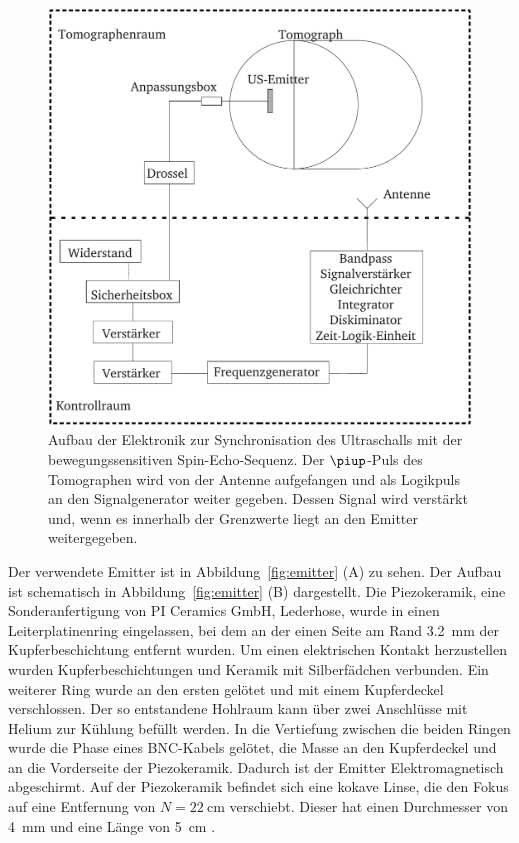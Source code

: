 \documentclass[
    11pt,
    ngerman
]{scrreprt}
\begin{document}
\begin{figure}[htbp]
    \centering
    \includegraphics[width=.8\textwidth]{Abbildungen/elektronik.pdf}
    \caption{%
        Aufbau der Elektronik zur Synchronisation des Ultraschalls mit der bewegungssensitiven Spin-Echo-Sequenz. Der $\piup$-Puls des Tomographen wird von der Antenne aufgefangen und als Logikpuls an den Signalgenerator weiter gegeben. Dessen Signal wird verstärkt und, wenn es innerhalb der Grenzwerte liegt an den Emitter weitergegeben.
    }
    \label{fig:elektronik}
\end{figure}

Der verwendete Emitter ist in Abbildung~\ref{fig:emitter} (A) zu sehen. Der Aufbau ist schematisch in Abbildung~\ref{fig:emitter} (B) dargestellt. Die Piezokeramik, eine Sonderanfertigung von PI Ceramics GmbH, Lederhose, wurde in einen Leiterplatinenring eingelassen, bei dem an der einen Seite am Rand \SI{3.2}{\milli\meter} der Kupferbeschichtung entfernt wurden. Um einen elektrischen Kontakt herzustellen wurden Kupferbeschichtungen und Keramik mit Silberfädchen verbunden. Ein weiterer Ring wurde an den ersten gelötet und mit einem Kupferdeckel verschlossen. Der so entstandene Hohlraum kann über zwei Anschlüsse mit Helium zur Kühlung befüllt werden. In die Vertiefung zwischen die beiden Ringen wurde die Phase eines BNC-Kabels gelötet, die Masse an den Kupferdeckel und an die Vorderseite der Piezokeramik. Dadurch ist der Emitter Elektromagnetisch abgeschirmt. Auf der Piezokeramik befindet sich eine kokave Linse, die den Fokus auf eine Entfernung von $N = \SI{22}{\centi\meter}$ verschiebt. Dieser hat einen Durchmesser von \SI{4}{\milli\meter} und eine Länge von \SI{5}{\centi\meter} \parencite{diss_radicke}.
\end{document}
